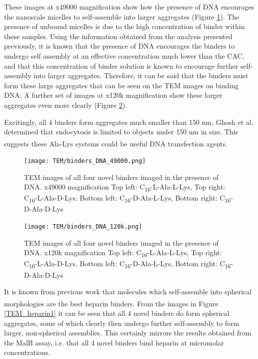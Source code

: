 These images at x49000 magnification show how the presence of DNA encourages the nanoscale micelles to self-assemble into larger aggregates (Figure \ref{TEM_DNA1}).  The presence of unbound micelles is due to the high concentration of binder within these samples. 
\newline
Using the information obtained from the analysis presented previously, it is known that the presence of DNA encourages the binders to undergo self assembly at an effective concentration much lower than the CAC, and that this concentration of binder solution is known to encourage further self-assembly into larger aggregates. 
Therefore, it can be said that the binders must form these large aggregates that can be seen on the TEM images on binding DNA. A further set of images at x120k magnification show these larger aggregates even more clearly (Figure \ref{TEM_DNA2}). 

Excitingly, all 4 binders form aggregates much smaller than 150 nm, Ghosh et al. determined that endocytosis is limited to objects under 150 nm in size. This suggests these Ala-Lys systems could be useful DNA transfection agents.\textsuperscript{\cite{Ghosh2008EfficientNanoparticles}}
\newpage
\begin{figure} [h!]
\centering
\texttt{[image: TEM/binders\_DNA\_49000.png]}
\caption{TEM images of all four novel binders imaged in the presence of DNA. x49000 magnification
Top left: C\textsubscript{16}-L-Ala-L-Lys, Top right: C\textsubscript{16}-L-Ala-D-Lys. Bottom left: C\textsubscript{16}-D-Ala-L-Lys, Bottom right: C\textsubscript{16}-D-Ala-D-Lys}
\label{TEM_DNA1}
\end{figure}

\newpage
\begin{figure} [h!]
\centering
\texttt{[image: TEM/binders\_DNA\_120k.png]}
\caption{TEM images of all four novel binders imaged in the presence of DNA. x120k magnification
Top left: C\textsubscript{16}-L-Ala-L-Lys, Top right: C\textsubscript{16}-L-Ala-D-Lys. Bottom left: C\textsubscript{16}-D-Ala-L-Lys, Bottom right: C\textsubscript{16}-D-Ala-D-Lys}
\label{TEM_DNA2}
\end{figure}

\newpage
It is known from previous work that molecules which self-assemble into spherical morphologies are the best heparin binders.\textsuperscript{\cite{Barnard2012Self-AssembledBinding}} From the images in Figure \ref{TEM_heparin1} it can be seen that all 4 novel binders do form spherical aggregates, some of which clearly then undergo further self-assembly to form larger, non-spherical assemblies. This certainly mirrors the results obtained from the MalB assay, i.e. that all 4 novel binders bind heparin at micromolar concentrations. 

